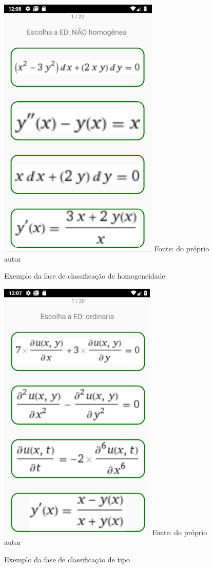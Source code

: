 \begin{figure}[H]
\centering
\caption{Exemplo da fase de classificação de homogeneidade}
\includegraphics[scale=0.72]{figuras/ex_ed_n_homog.png}
\small{Fonte: do próprio autor}
\end{figure}

\begin{figure}[H]
\centering
\caption{Exemplo da fase de classificação de tipo}
\includegraphics[scale=0.72]{figuras/ex_ed_ordinaria.png}
\small{Fonte: do próprio autor}
\end{figure}

